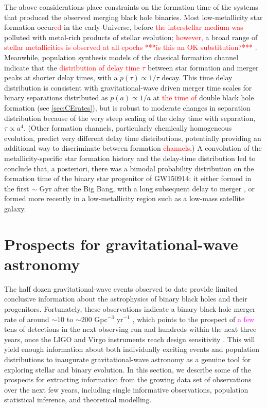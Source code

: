\documentclass[iop,onecolumn]{revtex4}
\newcommand{\ajf}[1]{\textcolor{red}{#1}}
\newcommand{\ilya}[1]{\textcolor{magenta}{#1}}
\begin{document}
The above considerations place constraints on the formation time of the systems that produced the observed merging black hole binaries. Most low-metallicity star formation occur\ajf{ed} in the early Universe, before \ajf{the interstellar medium was} polluted with metal-rich products of stellar evolution\ajf{; however,} a broad range of \ajf{stellar metallicities is observed at all epochs ***is this an OK substitution?***} \citep[e.g.,][]{LangerNorman:2006,TaylorKobayashi:2015}. Meanwhile, population synthesis models of the classical formation channel indicate that the \ajf{distribution of delay time $\tau$} between star formation and merger peaks at shorter delay times, with a $p(\tau) \propto 1/\tau$ decay.  This time delay distribution is consistent with gravitational-wave driven merger time scales for binary separations distributed as $p(a) \propto 1/a$ at \ajf{the time of} double black hole formation (see \autoref{sec:CErates}), but  is robust to moderate changes in separation distribution because of the very steep scaling of the delay time with separation, $\tau \propto a^4$.  (Other formation channels, particularly chemically homogeneous evolution, predict very different delay time distributions, potentially providing an additional way to discriminate between formation \ajf{channels}.)  A convolution of the metallicity-specific star formation history and the delay-time distribution led \citet{Belczynski:2016} to conclude that, a posteriori, there was a bimodal probability distribution on the formation time of the binary star progenitor of GW150914: it either formed in the first $\sim$ Gyr after the Big Bang, with a long subsequent delay to merger \citep{Dominik:2014}, or formed more recently in a low-metallicity region such as a low-mass satellite galaxy.  

  

\section{Prospects for gravitational-wave astronomy}\label{prospect}

The half dozen gravitational-wave events observed to date provide limited conclusive information about the astrophysics of binary black holes and their progenitors.  Fortunately, these observations indicate a binary black hole merger rate of around $\sim 10$ to $\sim 200$ Gpc$^{-3}$ yr$^{-1}$ \citep{GW150914:rates,GW170104}, which points to the prospect of \ilya{a few} tens of detections in the next observing run and hundreds within the next three years, once the LIGO and Virgo instruments reach design sensitivity \citep{scenarios}.  This will yield enough information about both individually exciting events and population distributions to inaugurate gravitational-wave astronomy as a genuine tool for exploring stellar and binary evolution.  In this section, we describe some of the prospects for extracting information from the growing data set of observations over the next few years, including single informative observations, population statistical inference, and theoretical modelling.
\end{document}
